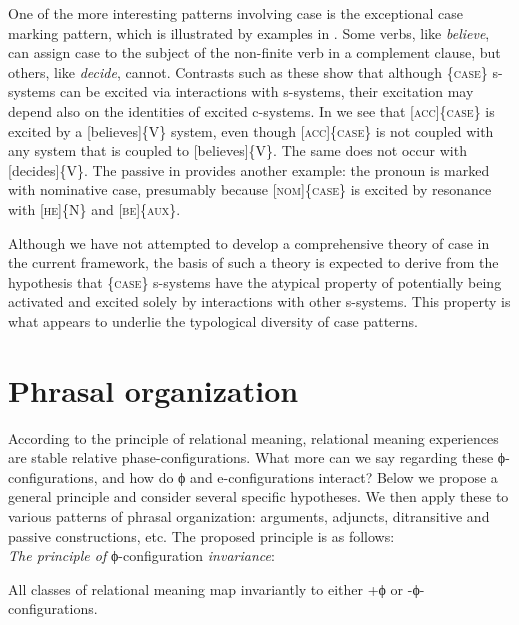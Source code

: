   One of the more interesting patterns involving case is the exceptional case marking pattern, which is illustrated by examples in . Some verbs, like \textit{believe}, can assign case to the subject of the non-finite verb in a complement clause, but others, like \textit{decide}, cannot. Contrasts such as these show that although \{\textsc{case}\} s-systems can be excited via interactions with s-systems, their excitation may depend also on the identities of excited c-systems. In  we see that \textsc{[acc]\{case\}} is excited by a [believes]\{V\} system, even though \textsc{[acc]\{case\}} is not coupled with any system that is coupled to [believes]\{V\}. The same does not occur with [decides]\{V\}. The passive in  provides another example: the pronoun is marked with nominative case, presumably because [\textsc{nom}]\{\textsc{case}\} is excited by resonance with [\textsc{he}]\{N\} and [\textsc{be}]\{\textsc{aux}\}.

  \ea\label{ex:4:2}
  \z
  \z
  Although we have not attempted to develop a comprehensive theory of case in the current framework, the basis of such a theory is expected to derive from the hypothesis that \{\textsc{case}\} s-systems have the atypical property of potentially being activated and excited solely by interactions with other s-systems. This property is what appears to underlie the typological diversity of case patterns. 

\section{Phrasal organization}

According to the principle of relational meaning, relational meaning experiences are stable relative phase-configurations. What more can we say regarding these ϕ-configurations, and how do ϕ and e-configurations interact? Below we propose a general principle and consider several specific hypotheses. We then apply these to various patterns of phrasal organization: arguments, adjuncts, ditransitive and passive constructions, etc. The proposed principle is as follows:\\

\textit{The principle of} ϕ-configuration \textit{invariance}: 

  All classes of relational meaning map invariantly to either +ϕ or -ϕ-configurations. \\

